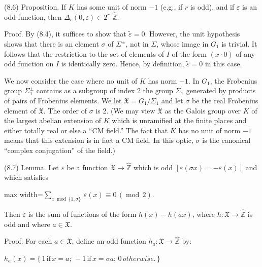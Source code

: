 \documentclass[11pt]{article}
\newcommand{\DFormula}[1]{\par\smallskip\noindent\begin{adjustbox}{max width=\linewidth}$\displaystyle #1$\end{adjustbox}\par\smallskip}
\begin{document}
\par
(8.6) Proposition. If \(K\) has some unit of norm \(-1\) (e.g., if \(r\) is odd), and if \(\varepsilon \) is an odd function, then \(\Delta _{c}(0,\varepsilon )\in 2^{r}\) \(\widehat{\mathbb{Z}}\).\par
\par
Proof. By (8.4), it suffices to show that \(\widetilde{\varepsilon }=0\). However, the unit hypothesis shows that there is an element \(\sigma \) of \(\Sigma ^{\pm }\), not in \(\Sigma \), whose image in \(G_{1}\) is trivial. It follows that the restriction to the set of elements of \(I\) of the form \((x\cdot 0)\) of any odd function on \(I\) is identically zero. Hence, by definition, \(\widetilde{\varepsilon }=0\) in this case.\par
\par
We now consider the case where no unit of \(K\) has norm \(-1\). In \(G_{1}\), the Frobenius group \(\Sigma _{1}^{\pm }\) contains as a subgroup of index 2 the group \(\Sigma _{1}\) generated by products of pairs of Frobenius elements. We let \(𝔛=G_{1}/\Sigma _{1}\) and let \(\sigma \) be the real Frobenius element of \(𝔛\). The order of \(\sigma \) is 2. (We may view \(𝔛\) as the Galois group over \(K\) of the largest abelian extension of \(K\) which is unramified at the finite places and either totally real or else a “CM field.” The fact that \(K\) has no unit of norm \(-1\) means that this extension is in fact a CM field. In this optic, \(\sigma \) is the canonical “complex conjugation” of the field.)\par
\par
(8.7) Lemma. Let \(\varepsilon \) be a function \(𝔛\to \widehat{\mathbb{Z}}\) which is odd \([\varepsilon (\sigma x)=-\varepsilon (x)]\) and which satisfies\par
\par
\DFormula{\sum _{x\,\operatorname{mod}\,\lbrace 1,\sigma \rbrace }\,\varepsilon (x)\equiv 0\,(\operatorname{mod}\,2).}
\par
Then \(\varepsilon \) is the sum of functions of the form \(h(x)-h(ax)\), where \(h:𝔛\to \widehat{\mathbb{Z}}\) is odd and where \(a\in 𝔛\).\par
\par
Proof. For each \(a\in 𝔛\), define an odd function \(h_{a}:𝔛\to \widehat{\mathbb{Z}}\) by:\par
\par
\(h_{a}(x)=\lbrace \,1\,\text{if}\,x=a;\,-1\,\text{if}\,x=\sigma a;\,0\,otherwise.\,\rbrace \)\par
\end{document}
